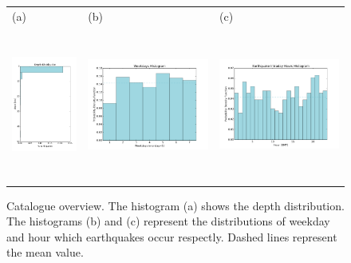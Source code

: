 \documentclass[draft, grl]{agutex}
\begin{document}
\begin{figure}
	\begin{center}
	\begin{table}[H]
		\begin{tabular}{ p{}
						 p{}
						 p{} }
		\footnotesize(a) &
		\footnotesize(b) &
		\footnotesize(c)
		\\
		\includegraphics[height=5cm]{z_img_hmtk_bsb2014_11_depth}  &
		\includegraphics[height=5cm]{z_img_hmtk_bsb2014_11_weekday} &
		\includegraphics[height=5cm]{z_img_hmtk_bsb2014_11_hour}
		\end{tabular}
	\end{table}
	\caption{Catalogue overview. The histogram (a) shows the depth distribution. The histograms (b) and (c) represent the distributions of weekday and hour which earthquakes occur respectly. Dashed lines represent the mean value.}
	\label{fig_overview}
	\end{center}
\end{figure}
\end{document}
